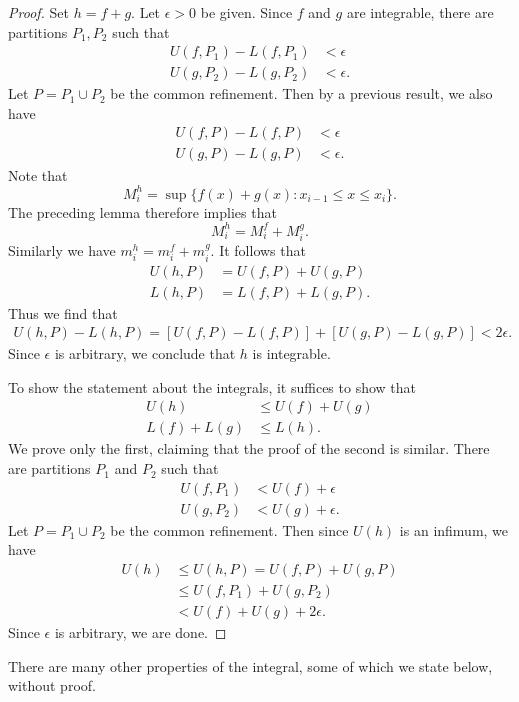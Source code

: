 \documentclass[12pt]{article}
\theoremstyle{definition}
\theoremstyle{theorem}
\begin{document}
\begin{proof}
Set $h = f + g$. Let $\epsilon > 0$ be given. Since $f$ and $g$ are integrable, there are partitions $P_1, P_2$ such that 
\begin{align*}
U(f,P_1) - L(f,P_1) &< \epsilon \\
U(g, P_2) - L(g, P_2) &< \epsilon.
\end{align*}
Let $P = P_1 \cup P_2$ be the common refinement. Then by a previous result, we also have 
\begin{align*}
U(f,P) - L(f,P) &< \epsilon \\
U(g, P) - L(g, P) &< \epsilon.
\end{align*}
Note that 
\[
M_i^h = \sup\{f(x) + g(x) : x_{i-1} \leqslant x \leqslant x_i\}.
\]
The preceding lemma therefore implies that 
\[
M_i^h = M_i^f + M_i^g.
\] 
Similarly we have $m_i^h = m_i^f + m_i^g$. It follows that  
\begin{align*}
U(h,P) &= U(f,P) + U(g,P) \\
L(h,P) &= L(f,P) + L(g,P).
\end{align*}
Thus we find that 
\begin{align*}
U(h,P) - L(h,P) = [U(f,P) - L(f,P)] + [U(g,P) - L(g,P)] < 2\epsilon.
\end{align*}
Since $\epsilon$ is arbitrary, we conclude that $h$ is integrable. 

To show the statement about the integrals, it suffices to show that 
\begin{align*}
U(h) &\leqslant U(f) + U(g) \\
L(f) + L(g) &\leqslant L(h).
\end{align*}
We prove only the first, claiming that the proof of the second is similar. There are partitions $P_1$ and $P_2$ such that 
\begin{align*}
U(f,P_1) &< U(f) + \epsilon \\
U(g, P_2) &< U(g) + \epsilon.
\end{align*}
Let $P = P_1 \cup P_2$ be the common refinement. Then since $U(h)$ is an infimum, we have 
\begin{align*}
U(h) &\leqslant U(h,P) = U(f,P) + U(g,P) \\
&\leqslant U(f,P_1) + U(g, P_2) \\
&< U(f) + U(g) + 2\epsilon.
\end{align*}
Since $\epsilon$ is arbitrary, we are done. 
\end{proof}

There are many other properties of the integral, some of which we state below, without proof. 
\end{document}
